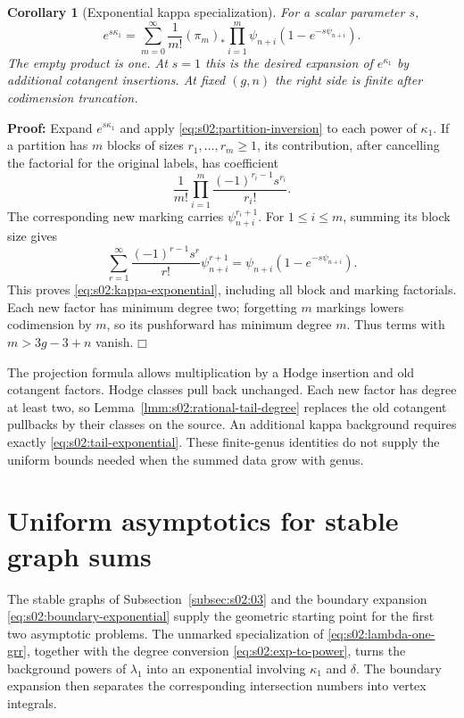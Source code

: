 \documentclass[a4paper,10pt]{article}
\numberwithin{equation}{section}
\theoremstyle{paperplain}
\newtheorem{crl}[thm]{Corollary}
\theoremstyle{paperremark}
\theoremstyle{paperplain}
\newenvironment{prf}{\noindent \textbf{Proof: }}{\hfill $\mdlgwhtsquare$\par\addvspace{0.5\baselineskip}}
\begin{document}
\begin{crl}[Exponential kappa specialization]
\label{crl:s02:kappa-exponential}
For a scalar parameter $s$,
\begin{equation}
\label{eq:s02:kappa-exponential}
e^{s\kappa_1}
=\sum_{m=0}^{\infty}\frac{1}{m!}(\pi_m)_*
\prod_{i=1}^m\psi_{n+i}(1-e^{-s\psi_{n+i}}).
\end{equation}
The empty product is one.  At $s=1$ this is the desired expansion of
$e^{\kappa_1}$ by additional cotangent insertions.  At fixed $(g,n)$
the right side is finite after codimension truncation.
\end{crl}

\begin{prf}
Expand $e^{s\kappa_1}$ and apply
\eqref{eq:s02:partition-inversion} to each power of $\kappa_1$.
If a partition has $m$ blocks of sizes $r_1,\ldots,r_m\geq1$, its
contribution, after cancelling the factorial for the original labels,
has coefficient
\[
\frac{1}{m!}\prod_{i=1}^m
\frac{(-1)^{r_i-1}s^{r_i}}{r_i!}.
\]
The corresponding new marking carries $\psi_{n+i}^{r_i+1}$.
For $1\leq i\leq m$, summing its block size gives
\[
\sum_{r=1}^{\infty}\frac{(-1)^{r-1}s^r}{r!}\psi_{n+i}^{r+1}
=\psi_{n+i}(1-e^{-s\psi_{n+i}}).
\]
This proves \eqref{eq:s02:kappa-exponential}, including all block
and marking factorials.  Each new factor has minimum degree two;
forgetting $m$ markings lowers codimension by $m$, so its pushforward
has minimum degree $m$.  Thus terms with $m>3g-3+n$ vanish.
\end{prf}

The projection formula allows multiplication by a Hodge insertion and
old cotangent factors.  Hodge classes pull back unchanged.  Each new
factor has degree at least two, so
Lemma~\ref{lmm:s02:rational-tail-degree} replaces the old cotangent
pullbacks by their classes on the source.  An additional kappa
background requires exactly \eqref{eq:s02:tail-exponential}.
These finite-genus identities do not supply the uniform bounds needed
when the summed data grow with genus.


\section{Uniform asymptotics for stable graph sums}
\label{sec:s03}

The stable graphs of Subsection~\ref{subsec:s02:03} and the boundary
expansion \eqref{eq:s02:boundary-exponential} supply the geometric
starting point for the first two asymptotic problems. The unmarked
specialization of \eqref{eq:s02:lambda-one-grr}, together with the
degree conversion \eqref{eq:s02:exp-to-power}, turns the background
powers of $\lambda_1$ into an exponential involving $\kappa_1$ and
$\delta$. The boundary expansion then separates the corresponding
intersection numbers into vertex integrals.
\end{document}
